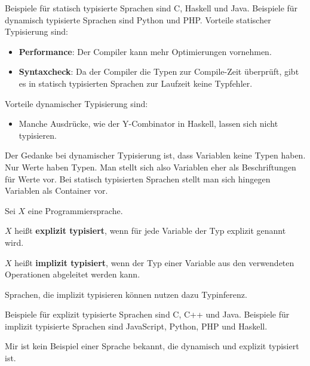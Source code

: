 Beispiele für statisch typisierte Sprachen sind C, Haskell und Java.
Beispiele für dynamisch typisierte Sprachen sind Python und PHP.
\goodbreak
Vorteile statischer Typisierung sind:

\begin{itemize}
    \item \textbf{Performance}: Der Compiler kann mehr Optimierungen vornehmen.
    \item \textbf{Syntaxcheck}: Da der Compiler die Typen zur Compile-Zeit überprüft,
                                gibt es in statisch typisierten Sprachen zur
                                Laufzeit keine Typfehler.
\end{itemize}

Vorteile dynamischer Typisierung sind:

\begin{itemize}
    \item Manche Ausdrücke, wie der Y-Combinator in Haskell, lassen sich nicht
          typisieren.
\end{itemize}

Der Gedanke bei dynamischer Typisierung ist, dass Variablen keine Typen haben.
Nur Werte haben Typen. Man stellt sich also Variablen eher als Beschriftungen für
Werte vor. Bei statisch typisierten Sprachen stellt man sich hingegen Variablen
als Container vor.

\begin{definition}%
    Sei $X$ eine Programmiersprache.
    \begin{defenum}
        \item $X$ heißt \textbf{explizit typisiert}, wenn für jede 
              Variable der Typ explizit genannt wird.
        \item $X$ heißt \textbf{implizit typisiert}, wenn der Typ einer
              Variable aus den verwendeten Operationen abgeleitet werden kann.
    \end{defenum}
\end{definition}

Sprachen, die implizit typisieren können nutzen dazu Typinferenz.

Beispiele für explizit typisierte Sprachen sind C, C++ und Java.
Beispiele für implizit typisierte Sprachen sind JavaScript, Python, PHP und Haskell.

Mir ist kein Beispiel einer Sprache bekannt, die dynamisch und explizit typisiert
ist.


